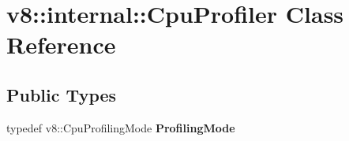 \hypertarget{classv8_1_1internal_1_1CpuProfiler}{}\section{v8\+:\+:internal\+:\+:Cpu\+Profiler Class Reference}
\label{classv8_1_1internal_1_1CpuProfiler}
\subsection*{Public Types}
\begin{DoxyCompactItemize}
\item 
\mbox{\label{classv8_1_1internal_1_1CpuProfiler_a6a4f9804517f929f447fc7636bce09d9}} 
typedef v8\+::\+Cpu\+Profiling\+Mode {\bfseries Profiling\+Mode}
\end{DoxyCompactItemize}
